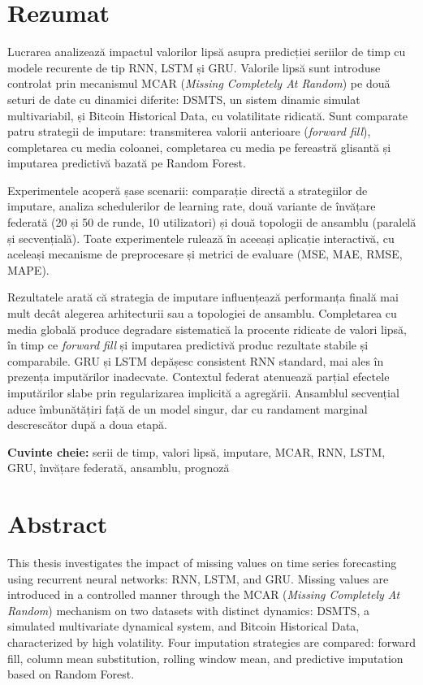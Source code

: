 \chapter*{Rezumat}

Lucrarea analizează impactul valorilor lipsă asupra predicției seriilor de timp cu modele recurente de tip RNN, LSTM și GRU. Valorile lipsă sunt introduse controlat prin mecanismul MCAR (\textit{Missing Completely At Random}) pe două seturi de date cu dinamici diferite: DSMTS, un sistem dinamic simulat multivariabil, și Bitcoin Historical Data, cu volatilitate ridicată. Sunt comparate patru strategii de imputare: transmiterea valorii anterioare (\textit{forward fill}), completarea cu media coloanei, completarea cu media pe fereastră glisantă și imputarea predictivă bazată pe Random Forest.

Experimentele acoperă șase scenarii: comparație directă a strategiilor de imputare, analiza schedulerilor de learning rate, două variante de învățare federată (20 și 50 de runde, 10 utilizatori) și două topologii de ansamblu (paralelă și secvențială). Toate experimentele rulează în aceeași aplicație interactivă, cu aceleași mecanisme de preprocesare și metrici de evaluare (MSE, MAE, RMSE, MAPE).

Rezultatele arată că strategia de imputare influențează performanța finală mai mult decât alegerea arhitecturii sau a topologiei de ansamblu. Completarea cu media globală produce degradare sistematică la procente ridicate de valori lipsă, în timp ce \textit{forward fill} și imputarea predictivă produc rezultate stabile și comparabile. GRU și LSTM depășesc consistent RNN standard, mai ales în prezența imputărilor inadecvate. Contextul federat atenuează parțial efectele imputărilor slabe prin regularizarea implicită a agregării. Ansamblul secvențial aduce îmbunătățiri față de un model singur, dar cu randament marginal descrescător după a doua etapă.

\vspace{1em}
\noindent\textbf{Cuvinte cheie:} serii de timp, valori lipsă, imputare, MCAR, RNN, LSTM, GRU, învățare federată, ansamblu, prognoză

\vspace{2em}
\chapter*{Abstract}

This thesis investigates the impact of missing values on time series forecasting using recurrent neural networks: RNN, LSTM, and GRU. Missing values are introduced in a controlled manner through the MCAR (\textit{Missing Completely At Random}) mechanism on two datasets with distinct dynamics: DSMTS, a simulated multivariate dynamical system, and Bitcoin Historical Data, characterized by high volatility. Four imputation strategies are compared: forward fill, column mean substitution, rolling window mean, and predictive imputation based on Random Forest.

